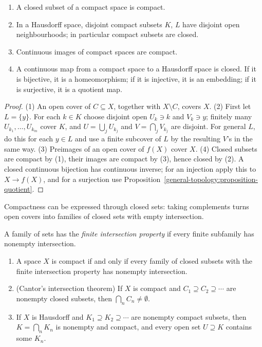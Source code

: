 \begin{proposition}\label{general-topology:proposition-compact-basic}
\begin{enumerate}
\item A closed subset of a compact space is compact.
\item In a Hausdorff space, disjoint compact subsets $K$, $L$ have disjoint open neighbourhoods; in particular compact subsets are closed.
\item Continuous images of compact spaces are compact.
\item A continuous map from a compact space to a Hausdorff space is closed. If it is bijective, it is a homeomorphism; if it is injective, it is an
embedding; if it is surjective, it is a quotient map.
\end{enumerate}
\end{proposition}

\begin{proof}
(1) An open cover of $C \subseteq X$, together with $X \setminus C$, covers $X$. (2) First let $L = \{y\}$. For each $k \in K$ choose disjoint open
$U_k \ni k$ and $V_k \ni y$; finitely many $U_{k_1}, \ldots, U_{k_m}$ cover $K$, and $U = \bigcup_j U_{k_j}$ and $V = \bigcap_j V_{k_j}$ are disjoint.
For general $L$, do this for each $y \in L$ and use a finite subcover of $L$ by the resulting $V$'s in the same way. (3) Preimages of an open cover of
$f(X)$ cover $X$. (4) Closed subsets are compact by (1), their images are compact by (3), hence closed by (2). A closed continuous bijection has continuous
inverse; for an injection apply this to $X \to f(X)$, and for a surjection use Proposition~\ref{general-topology:proposition-quotient}.
\end{proof}

Compactness can be expressed through closed sets: taking complements turns open covers into families of closed sets with empty intersection.

\begin{proposition}\label{general-topology:proposition-fip}
A family of sets has the \emph{finite intersection property} if every finite subfamily has nonempty intersection.
\begin{enumerate}
\item A space $X$ is compact if and only if every family of closed subsets with the finite intersection property has nonempty intersection.
\item (Cantor's intersection theorem) If $X$ is compact and $C_1 \supseteq C_2 \supseteq \cdots$ are nonempty closed subsets, then $\bigcap_nC_n \neq \emptyset$.
\item If $X$ is Hausdorff and $K_1 \supseteq K_2 \supseteq \cdots$ are nonempty compact subsets, then $K = \bigcap_nK_n$ is nonempty and compact, and every open set $U \supseteq K$ contains some $K_n$.
\end{enumerate}
\end{proposition}

